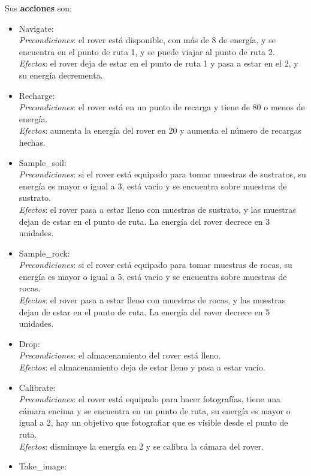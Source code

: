 \documentclass{uc3mpracticas}
\begin{document}
  Sus \textbf{acciones} son:
  \begin{itemize}
    \item Navigate:
    \\\textit{Precondiciones}: el rover está disponible, con más de 8 de energía, y se encuentra en el punto de ruta 1, y se puede viajar al punto de ruta 2.
    \\\textit{Efectos}: el rover deja de estar en el punto de ruta 1 y pasa a estar en el 2, y su energía decrementa.
    \item Recharge:
    \\\textit{Precondiciones}: el rover está en un punto de recarga y tiene de 80 o menos de energía.
    \\\textit{Efectos}: aumenta la energía del rover en 20 y aumenta el número de recargas hechas.
    \item Sample\_soil:
    \\\textit{Precondiciones}: si el rover está equipado para tomar muestras de sustratos, su energía es mayor o igual a 3, está vacío y se encuentra sobre muestras de sustrato.
    \\\textit{Efectos}: el rover pasa a estar lleno con muestras de sustrato, y las muestras dejan de estar en el punto de ruta. La energía del rover decrece en 3 unidades.
    \item Sample\_rock:
    \\\textit{Precondiciones}: si el rover está equipado para tomar muestras de rocas, su energía es mayor o igual a 5, está vacío y se encuentra sobre muestras de rocas.
    \\\textit{Efectos}: el rover pasa a estar lleno con muestras de rocas, y las muestras dejan de estar en el punto de ruta. La energía del rover decrece en 5 unidades.
    \item Drop:
    \\\textit{Precondiciones}: el almacenamiento del rover está lleno.
    \\\textit{Efectos}: el almacenamiento deja de estar lleno y pasa a estar vacío.
    \item Calibrate:
    \\\textit{Precondiciones}: el rover está equipado para hacer fotografías, tiene una cámara encima y se encuentra en un punto de ruta, su energía es mayor o igual a 2, hay un objetivo que fotografiar que es visible desde el punto de ruta.
    \\\textit{Efectos}: disminuye la energía en 2 y se calibra la cámara del rover.
    \item Take\_image:

\end{itemize}
\end{document}
